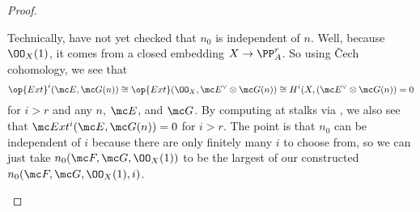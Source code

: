 \documentclass[../notes.tex]{subfiles}
\begin{document}
\begin{proof}
\begin{enumerate}
		Technically, have not yet checked that $n_0$ is independent of $n$. Well, because $\OO_X(1)$, it comes from a closed embedding $X\to\PP^r_A$. So using \v Cech cohomology, we see that
		\[\op{Ext}^i(\mc E,\mc G(n))\cong\op{Ext}(\OO_X,\mc E^\lor\otimes\mc G(n))\cong H^i(X,(\mc E^\lor\otimes\mc G(n))=0\]
		for $i>r$ and any $n$, $\mc E$, and $\mc G$. By computing at stalks via , we also see that $\mc Ext^i(\mc E,\mc G(n))=0$ for $i>r$. The point is that $n_0$ can be independent of $i$ because there are only finitely many $i$ to choose from, so we can just take $n_0(\mc F,\mc G,\OO_X(1))$ to be the largest of our constructed $n_0(\mc F,\mc G,\OO_X(1),i)$.
		\qedhere
	\end{enumerate}
\end{proof}
\end{document}
